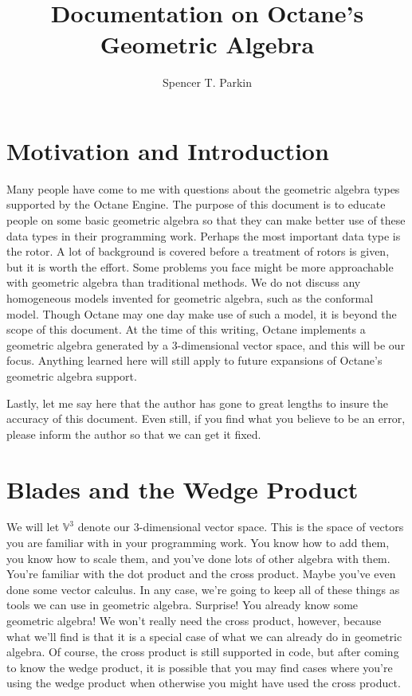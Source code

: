 \documentclass{article}
\title{Documentation on Octane's\\Geometric Algebra}
\author{Spencer T. Parkin}
\newcommand{\V}{\mathbb{V}}
\begin{document}
\maketitle

\section{Motivation and Introduction}

Many people have come to me with questions about
the geometric algebra types supported by the Octane Engine.
The purpose of this document is to educate people on
some basic geometric algebra so that they can make better use
of these
data types in their programming work.  Perhaps the most important data type is
the rotor.  A lot of background is covered before a
treatment of rotors is given, but it is worth the effort.
Some problems you face might be more approachable with
geometric algebra than traditional methods.
We do not discuss any homogeneous models invented for
geometric algebra, such as the conformal model.
Though Octane may one day make use
of such a model, it is beyond the scope of this document.
At the time of this writing, Octane implements a geometric
algebra generated by a 3-dimensional vector space, and this
will be our focus.  Anything learned here will still apply to
future expansions of Octane's geometric algebra support.

Lastly, let me say here that the author has gone to great lengths to
insure the accuracy of this document.  Even still, if you find
what you believe to be an error, please inform the author so that
we can get it fixed.

\section{Blades and the Wedge Product}

We will let $\V^3$ denote our 3-dimensional vector space.
This is the space of vectors you are familiar with in your programming work.
You know how to add them, you know how to scale them, and you've
done lots of other algebra with them.  You're familiar with the dot product
and the cross product.  Maybe you've even done some vector calculus.
In any case, we're going to keep all of these
things as tools we can use in geometric algebra.  Surprise!  You already know
some geometric algebra!  We won't really need the
cross product, however, because what we'll
find is that it is a special case of what we can already do in geometric algebra.
Of course, the cross product is still supported in code, but after coming
to know the wedge product, it is possible that you may find cases where
you're using the wedge product when otherwise you might have used
the cross product.
\end{document}
